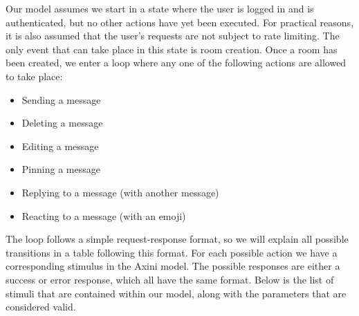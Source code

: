 \documentclass[a4paper]{article}
\begin{document}
Our model assumes we start in a state where the user is logged in and is authenticated, but no other actions have yet been executed. For practical reasons, it is also assumed that the user's requests are not subject to rate limiting. The only event that can take place in this state is room creation. Once a room has been created, we enter a loop where any one of the following actions are allowed to take place:
\begin{itemize}
	\item Sending a message
	\item Deleting a message
	\item Editing a message
	\item Pinning a message
	\item Replying to a message (with another message)
	\item Reacting to a message (with an emoji)
\end{itemize}

The loop follows a simple request-response format, so we will explain all possible transitions in a table following this format. For each possible action we have a corresponding stimulus in the Axini model. The possible responses are either a success or error response, which all have the same format. Below is the list of stimuli that are contained within our model, along with the parameters that are considered valid. 
\end{document}
